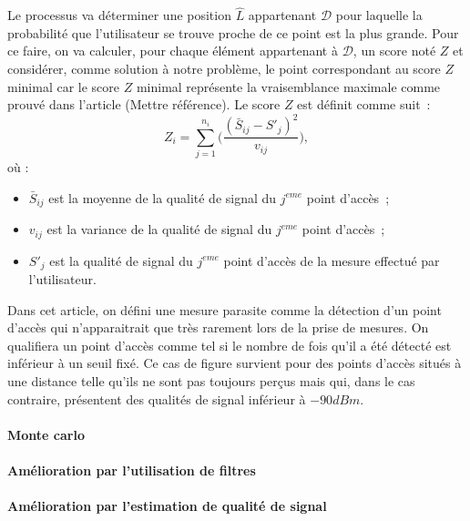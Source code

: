 \documentclass[11pt,journal,compsoc]{IEEEtran}
\begin{document}
        Le processus va déterminer une position $\hat{L}$ appartenant $\mathcal{D}$ pour laquelle la probabilité que l'utilisateur se trouve proche de ce point est la plus grande.
		Pour ce faire, on va calculer, pour chaque élément appartenant à $\mathcal{D}$, un score noté $Z$ et considérer, comme solution à notre problème, le point correspondant
		au score $Z$ minimal car le score $Z$ minimal représente la vraisemblance maximale comme prouvé dans l'article (Mettre référence). Le score $Z$ est définit comme suit~:
        \begin{equation}
          Z_{i} = \sum\limits_{j = 1}^{n_{i}}\bigg(\frac{(\bar{S}_{ij}-S'_{j})^{2}}{v_{ij}}\bigg),
        \end{equation}
        où :
        \begin{itemize}
          \item $\bar{S}_{ij}$ est la moyenne de la qualité de signal du $j^{eme}$ point d'accès~;
          \item $v_{ij}$ est la variance de la qualité de signal du $j^{eme}$ point d'accès~;
          \item $S'_{j}$ est la qualité de signal du $j^{eme}$ point d'accès de la mesure effectué par l'utilisateur.
        \end{itemize}

        \begin{tcolorbox}[title = Mesures parasites]
          Dans cet article, on défini une mesure parasite comme la détection d'un point d'accès qui n'apparaitrait que très rarement lors de la prise de mesures. On qualifiera
		  un point d'accès comme tel si le nombre de fois qu'il a été détecté est inférieur à un seuil fixé.
          Ce cas de figure survient pour des points d'accès situés à une distance telle qu'ils ne sont pas toujours perçus mais qui, dans le cas contraire, présentent des qualités
		  de signal inférieur à $-90 dBm$.
        \end{tcolorbox}

      \paragraph{Monte carlo}
      \paragraph{Amélioration par l'utilisation de filtres}
      \paragraph{Amélioration par l'estimation de qualité de signal}
\end{document}
